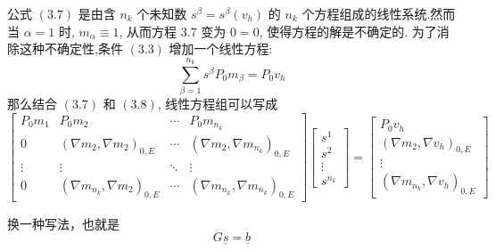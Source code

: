 \documentclass[12pt]{article}
\begin{document}
\begin{CJK}{UTF8}{gkai}
    公式 $(3.7)$ 是由含 $n_k$ 个未知数 $s^{\beta} = s^{\beta}(v_h)$ 的 $n_k$ 个方程组成的线性系统.然而当 $\alpha = 1$ 时, $m_{\alpha} \equiv 1$, 从而方程 $3.7$ 变为 $0 = 0$, 使得方程的解是不确定的. 为了消除这种不确定性,条件 $(3.3)$ 增加一个线性方程: \\
    \begin{equation}
    \sum_{\beta = 1}^{n_k}s^{\beta}P_0m_{\beta} = P_0v_h
    \end{equation}
    那么结合 $(3.7)$ 和 $(3.8)$, 线性方程组可以写成 \\
    \begin{equation*}
    \left[ \begin{array}{cccc}
    P_0m_1 & P_0m_2  &\cdots&P_0m_{n_k} \\
    0 & (\nabla m_2,\nabla m_2)_{0,E} & \cdots & (\nabla m_2,\nabla m_{n_k})_{0,E} \\
    \vdots & \vdots & \ddots & \vdots\\
    0& (\nabla m_{n_k},\nabla m_2)_{0,E} & \cdots & (\nabla m_{n_k},\nabla m_{n_k})_{0,E}
    \end{array} \right]
    \left[ \begin{array}{c}
    s^1\\
    s^2\\
    \vdots\\
    s^{n_k}
    \end{array} \right]
    = \left[\begin{array}{c}
    P_0v_h\\
    (\nabla m_2,\nabla v_h)_{0,E} \\
    \vdots\\
    (\nabla m_{n_k},\nabla v_h)_{0,E} 
    \end{array}\right]
    \end{equation*}
    
    换一种写法，也就是 \\
    \begin{equation}
    G\underline{s} = \underline{b}
    \end{equation}
    

\end{CJK}
\end{document}
